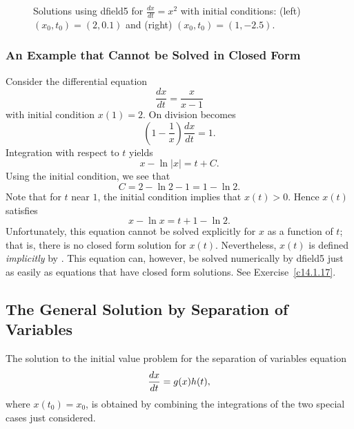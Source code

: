 \documentclass{ximera}
\begin{document}
\begin{figure}[htb]
           \centerline{%
	   }
           \caption{Solutions using {\sf dfield5} for $\frac{dx}{dt} = x^2$ 
		with initial conditions: (left) $(x_0,t_0)=(2,0.1)$ and 
		(right) $(x_0,t_0)=(1,-2.5)$.}
           \label{F:x^2}
\end{figure}

\subsubsection*{An Example that Cannot be Solved in Closed Form}

Consider the differential equation
\begin{equation}  \label{E:ncf}
\frac{dx}{dt} = \frac{x}{x-1}
\end{equation}
with initial condition $x(1)=2$. On division  becomes 
\[
\left(1-\frac{1}{x}\right)\frac{dx}{dt} = 1.
\]
Integration with respect to $t$ yields
\[
x - \ln|x| = t + C.
\]
Using the initial condition, we see that 
\[
C = 2 - \ln 2 -1 = 1 - \ln 2.
\]
Note that for $t$ near $1$, the initial condition implies that $x(t)>0$.  
Hence $x(t)$ satisfies
\begin{equation} \label{e:solnncf}
x -\ln x = t + 1 - \ln 2.
\end{equation}
Unfortunately, this equation cannot be solved explicitly for $x$ 
as a function of $t$; that is, there is no closed form 
solution 
for $x(t)$.  Nevertheless, $x(t)$ is defined 
{\em implicitly\/} 
by .  This equation can, however, be solved numerically by
{\sf dfield5} just as easily as equations that have closed form solutions.
See Exercise~\ref{c14.1.17}. 

\subsection*{The General Solution by Separation of Variables}

The solution to the initial value problem for the separation
of variables equation
\begin{equation}  \label{eq:ghivp}
\displaystyle \frac{dx}{dt} =  g(x) h(t),
\end{equation}
where $x(t_0) = x_0$, is obtained by combining the integrations of the two 
special cases just considered.  
\end{document}
